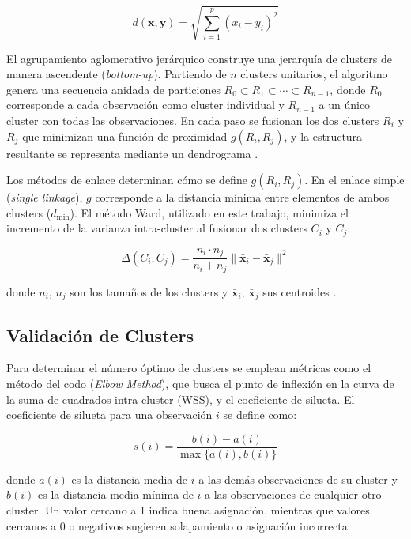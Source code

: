 \documentclass[10pt,a4paper]{article}
\begin{document}
\begin{equation}
  d(\mathbf{x}, \mathbf{y}) = \sqrt{\sum_{i=1}^{p}(x_i - y_i)^2}
\end{equation}

El agrupamiento aglomerativo jerárquico construye una jerarquía de clusters de manera ascendente (\textit{bottom-up}). Partiendo de $n$ clusters unitarios, el algoritmo genera una secuencia anidada de particiones $R_0 \subset R_1 \subset \cdots \subset R_{n-1}$, donde $R_0$ corresponde a cada observación como cluster individual y $R_{n-1}$ a un único cluster con todas las observaciones. En cada paso se fusionan los dos clusters $R_i$ y $R_j$ que minimizan una función de proximidad $g(R_i, R_j)$, y la estructura resultante se representa mediante un dendrograma \citep{murtagh2012}.

Los métodos de enlace determinan cómo se define $g(R_i, R_j)$. En el enlace simple (\textit{single linkage}), $g$ corresponde a la distancia mínima entre elementos de ambos clusters ($d_{\min}$). El método Ward, utilizado en este trabajo, minimiza el incremento de la varianza intra-cluster al fusionar dos clusters $C_i$ y $C_j$:

\begin{equation}
  \Delta(C_i, C_j) = \frac{n_i \cdot n_j}{n_i + n_j} \|\bar{\mathbf{x}}_i - \bar{\mathbf{x}}_j\|^2
\end{equation}

donde $n_i$, $n_j$ son los tamaños de los clusters y $\bar{\mathbf{x}}_i$, $\bar{\mathbf{x}}_j$ sus centroides \citep{everitt2011}.

\subsection{Validación de Clusters}

Para determinar el número óptimo de clusters se emplean métricas como el método del codo (\textit{Elbow Method}), que busca el punto de inflexión en la curva de la suma de cuadrados intra-cluster (WSS), y el coeficiente de silueta. El coeficiente de silueta para una observación $i$ se define como:

\begin{equation}
  s(i) = \frac{b(i) - a(i)}{\max\{a(i), b(i)\}}
\end{equation}

donde $a(i)$ es la distancia media de $i$ a las demás observaciones de su cluster y $b(i)$ es la distancia media mínima de $i$ a las observaciones de cualquier otro cluster. Un valor cercano a 1 indica buena asignación, mientras que valores cercanos a 0 o negativos sugieren solapamiento o asignación incorrecta \citep{rousseeuw1987}.
\end{document}
